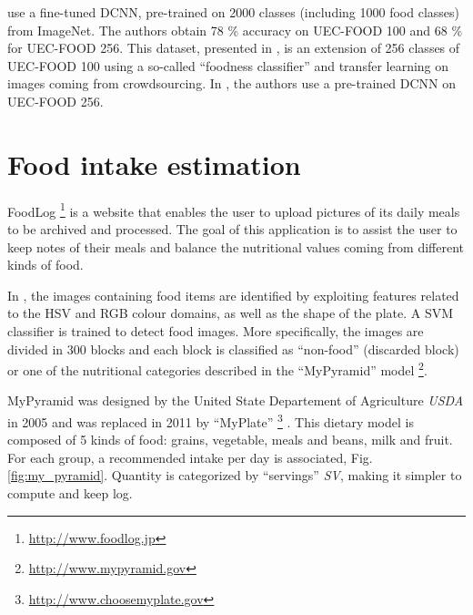 \cite{Yanai2015} use a fine-tuned DCNN, pre-trained on 2000 classes (including 1000 food classes) from ImageNet. The authors obtain 78 \% accuracy on UEC-FOOD 100 and 68 \% for UEC-FOOD 256. This dataset, presented in \cite{Kawano2015}, is an extension of 256 classes of UEC-FOOD 100 using a so-called \enquote{foodness classifier} and transfer learning on images coming from crowdsourcing.
In \cite{Bolanos2016}, the authors use a pre-trained DCNN on UEC-FOOD 256.

\section{Food intake estimation}


FoodLog \footnote{\url{http://www.foodlog.jp}} is a website that enables the user to upload pictures of its daily meals to be archived and processed. The goal of this application is to assist the user to keep notes of their meals and balance the nutritional values coming from different kinds of food.

In \cite{Kitamura2008}, the images containing food items are identified by exploiting features related to the HSV and RGB colour domains, as well as the shape of the plate. A SVM classifier is trained to detect food images. More specifically, the images are divided in 300 blocks and each block is classified as \enquote{non-food} (discarded block) or one of the nutritional categories described in the \enquote{MyPyramid} model \footnote{\url{http://www.mypyramid.gov}}.

MyPyramid \cite{MyPyramid} was designed by the United State Departement of Agriculture \textit{USDA} in 2005 and was replaced in 2011 by \enquote{MyPlate} \footnote{\url{http://www.choosemyplate.gov}} \cite{MyPlate}. This dietary model is composed of 5 kinds of food: grains, vegetable, meals and beans, milk and fruit. For each group, a recommended intake per day is associated, Fig. \ref{fig:my_pyramid}. Quantity is categorized by \enquote{servings} \textit{SV}, making it simpler to compute and keep log.

